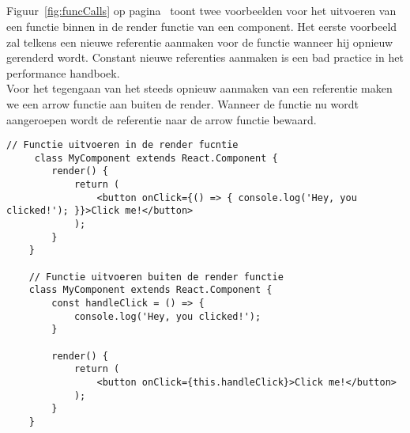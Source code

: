 \subsection{}
\label{sec:functionCalls}

Figuur~\ref{fig:funcCalls} op pagina~\pageref{fig:funcCalls} toont twee voorbeelden voor het uitvoeren van een functie binnen in de render functie van een component. Het eerste voorbeeld zal telkens een nieuwe referentie aanmaken voor de functie wanneer hij opnieuw gerenderd wordt. Constant nieuwe referenties aanmaken is een bad practice in het performance handboek.\\
Voor het tegengaan van het steeds opnieuw aanmaken van een referentie maken we een arrow functie aan buiten de render. Wanneer de functie nu wordt aangeroepen wordt de referentie naar de arrow functie bewaard.

\newpage
\begin{lstlisting}[caption=Lazy loading met suspense, label={fig:funcCalls}]
     // Functie uitvoeren in de render fucntie
     class MyComponent extends React.Component {
        render() {
            return (
                <button onClick={() => { console.log('Hey, you clicked!'); }}>Click me!</button>
            );
        }
    }
    
    // Functie uitvoeren buiten de render functie
    class MyComponent extends React.Component {
        const handleClick = () => {
            console.log('Hey, you clicked!');
        }
        
        render() {
            return (
                <button onClick={this.handleClick}>Click me!</button>
            );
        }
    }
\end{lstlisting}

            
